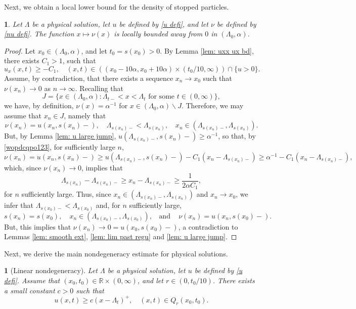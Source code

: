 \documentclass{article}
\numberwithin{equation}{section}
\numberwithin{figure}{section}
\theoremstyle{plain}
\theoremstyle{plain}
\newtheorem{prop}[thm]{\protect\propositionname}
\theoremstyle{plain}
\theoremstyle{plain}
\newtheorem{lem}[thm]{\protect\lemmaname}
\theoremstyle{definition}
\theoremstyle{remark}
\def\R{{\mathbb{R}}}
\providecommand{\lemmaname}{Lemma}
\providecommand{\propositionname}{Proposition}
\begin{document}
Next, we obtain a local lower bound for the density of stopped particles.
\begin{lem} \label{lem: nu lower bd} Let $\Lambda$ be a physical solution, let $u$ be defined by \eqref{u defi}, and let $\nu$ be defined by \eqref{nu defi}. The function $x \mapsto \nu(x)$ is locally bounded away from $0$ in $(\Lambda_0,\alpha)$.
\end{lem}
\begin{proof} Let $x_0\in (\Lambda_0,\alpha)$, and let $t_0 =s(x_0)>0$.
     By Lemma \ref{lem: uxx ux bd}, there exists $C_1>1$, such that 
\begin{equation} \label{wopdcqpo123}  u_x(x,t) \geq-C_1, \quad (x,t)\in ((x_0-10\alpha,x_0+10\alpha)\times (t_0/10,\infty))\cap \{u>0\}.\end{equation}
Assume, by contradiction, that there exists a sequence $x_n \to x_0$ such that $\nu(x_n)\to 0$ as $n\to \infty$. Recalling that
\begin{equation}
    J=\{x\in (\Lambda_0,\alpha): \Lambda_{t-}<x<\Lambda_{t} \text{ for some } t\in (0,\infty)\}, 
\end{equation}
we have, by definition, $\nu(x) =\alpha^{-1}$ for $x\in (\Lambda_0,\alpha)\backslash J$.  Therefore, we may assume that $x_n\in J$, namely that \[ \nu(x_n)=u(x_n,s(x_n)-), \quad \Lambda_{s(x_n)-}<\Lambda_{s(x_n)}, \quad x_n \in (\Lambda_{s(x_n)-},\Lambda_{s(x_n)}).\]
But, by Lemma \ref{lem: u large jump}, $u(\Lambda_{s(x_n)-},s(x_n)-)\geq \alpha^{-1}$, so that, by \eqref{wopdcqpo123}, for sufficiently large $n$,
\begin{equation} 
   \nu(x_n)=u(x_n,s(x_n)-)\geq u(\Lambda_{s(x_n)-},s(x_n)-)-C_1(x_n-\Lambda_{s(x_n)-})\geq \alpha^{-1} -C_1(x_n-\Lambda_{s(x_n)-}),  
\end{equation}
which, since $\nu(x_n)\to 0$, implies that
\[\Lambda_{s(x_n)}-\Lambda_{s(x_n)-}\geq x_n-\Lambda_{s(x_n)-}\geq \frac{1}{2\alpha C_1},\]
for $n$ sufficiently large. Thus, since $x_n \in (\Lambda_{s(x_n)-},\Lambda_{s(x_n)})$ and $x_n \to x_0$,  we infer that $\Lambda_{s(x_0)-}<\Lambda_{s(x_0)}$ and, for $n$ sufficiently large,
\[ s(x_n)=s(x_0), \quad x_n\in (\Lambda_{s(x_0)-},\Lambda_{s(x_0)}), \;\;\text{ and } \;\; \;\nu(x_n)=u(x_n,s(x_0)-).\] But, this implies that $\nu(x_n) \to 0=u(x_0,s(x_0)-)$, a contradiction to Lemmas \ref{lem: smooth ext}, \ref{lem: lim past regu} and \ref{lem: u large jump}.
\end{proof}
Next, we derive the main nondegeneracy estimate for physical solutions.
\begin{prop}[Linear nondegeneracy] \label{prop: u nondegeneracy} Let $\Lambda$ be a physical solution, let $u$ be defined by \eqref{u defi}. Assume that $(x_0,t_0) \in \R \times (0,\infty)$, and let $r \in (0,t_0/10)$. There exists a small constant $c>0$ such that   
\begin{equation}
    u(x,t)\geq c(x-\Lambda_t)^+, \quad (x,t)\in Q_r(x_0,t_0).
\end{equation}
\end{prop}
\end{document}
